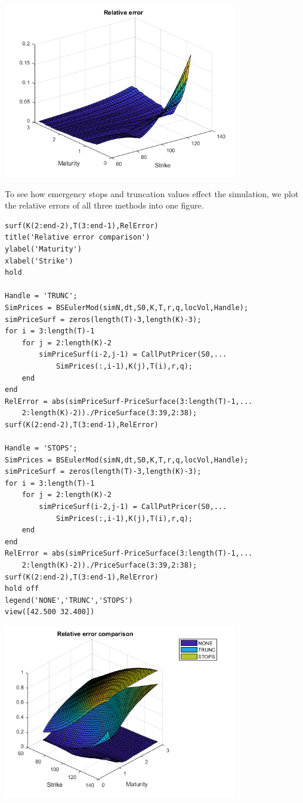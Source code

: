 \includegraphics [width=4in]{fig/ScriptM_03.png}
\begin{par}
To see how emergency stops and truncation values effect the simulation, we plot the relative errors of all three methods into one figure.
\end{par} \vspace{1em}
\begin{verbatim}
surf(K(2:end-2),T(3:end-1),RelError)
title('Relative error comparison')
ylabel('Maturity')
xlabel('Strike')
hold

Handle = 'TRUNC';
SimPrices = BSEulerMod(simN,dt,S0,K,T,r,q,locVol,Handle);
simPriceSurf = zeros(length(T)-3,length(K)-3);
for i = 3:length(T)-1
    for j = 2:length(K)-2
        simPriceSurf(i-2,j-1) = CallPutPricer(S0,...
        	SimPrices(:,i-1),K(j),T(i),r,q);
    end
end
RelError = abs(simPriceSurf-PriceSurface(3:length(T)-1,...
	2:length(K)-2))./PriceSurface(3:39,2:38);
surf(K(2:end-2),T(3:end-1),RelError)

Handle = 'STOPS';
SimPrices = BSEulerMod(simN,dt,S0,K,T,r,q,locVol,Handle);
simPriceSurf = zeros(length(T)-3,length(K)-3);
for i = 3:length(T)-1
    for j = 2:length(K)-2
        simPriceSurf(i-2,j-1) = CallPutPricer(S0,...
        	SimPrices(:,i-1),K(j),T(i),r,q);
    end
end
RelError = abs(simPriceSurf-PriceSurface(3:length(T)-1,...
	2:length(K)-2))./PriceSurface(3:39,2:38);
surf(K(2:end-2),T(3:end-1),RelError)
hold off
legend('NONE','TRUNC','STOPS')
view([42.500 32.400])
\end{verbatim}
    
\includegraphics [width=4in]{fig/ScriptM_04.png}


